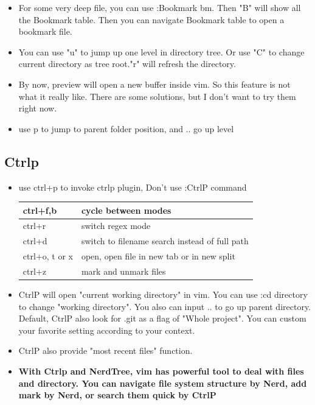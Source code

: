 \documentclass[a4paper,12pt,twoside]{book}
\begin{document}
\begin{itemize}
\begin{itemize}
		\item For some very deep file, you can use :Bookmark bm. Then "B" will show all the Bookmark table. Then you can navigate Bookmark table to open a bookmark file.
		\item You can use "u" to jump up one level in directory tree. Or use "C" to change current directory as tree root."r" will refresh the directory.
		\item By now, preview will open a new buffer inside vim. So this feature is not what it really like. There are some solutions, but I don't want to try them right now.

		\item use p to jump to parent folder position, and .. go up level
\end{itemize}

\subsection{Ctrlp}
\begin{itemize}
\item use ctrl+p to invoke ctrlp plugin, Don't use :CtrlP command  \\ 
\begin{tabular}{|p{}|p{}|}
\hline 
ctrl+f,b  & cycle between modes \\ 
\hline 
ctrl+r & switch regex mode  \\ 
\hline 
ctrl+d & switch to filename search instead of full path \\ 
\hline 
ctrl+o, t or x & open, open file in new tab or in new split \\ 
\hline 
ctrl+z  & mark and unmark files \\ 
\hline 
\end{tabular} 
\item CtrlP will open "current working directory" in vim. You can use :cd directory to change "working directory". You also can input .. to go up parent directory. Default, CtrlP also look for .git as a flag of "Whole project". You can custom your favorite setting according to your context.

\item CtrlP also provide "most recent files" function.

\item \textbf{With Ctrlp and NerdTree, vim has powerful tool to deal with files and directory. You can navigate file system structure by Nerd, add mark by Nerd, or search them quick by CtrlP}
\end{itemize}




\end{itemize}
\end{document}
